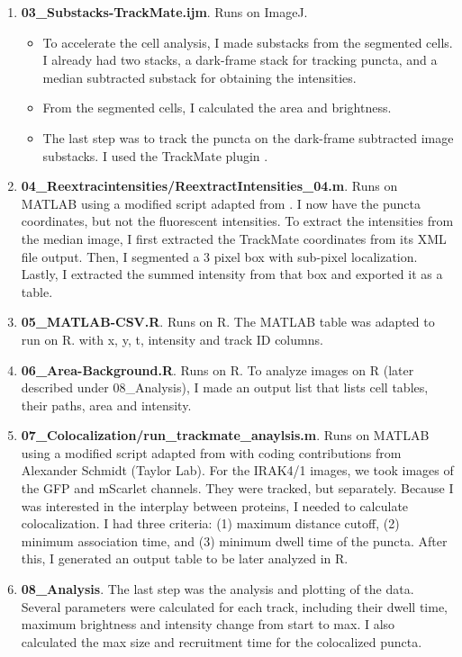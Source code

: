 \begin{enumerate}
\item \textbf{03\_Substacks-TrackMate.ijm}. Runs on ImageJ. 

\begin{itemize}

\item To accelerate the cell analysis, I made substacks from the segmented cells. I already had two stacks, a dark-frame stack for tracking puncta, and a median subtracted substack for obtaining the intensities.

\item From the segmented cells, I calculated the area and brightness.

\item The last step was to track the puncta on the dark-frame subtracted image substacks. I used the TrackMate plugin \autocite{Tinevez_2017}.

\end{itemize}

\item \textbf{04\_Reextracintensities/ReextractIntensities\_04.m}. Runs on MATLAB using a modified script adapted from \autocite{Taylor_2017}. I now have the puncta coordinates, but not the fluorescent intensities. To extract the intensities from the median image, I first extracted the TrackMate coordinates from its XML file output. Then, I segmented a 3 pixel box with sub-pixel localization. Lastly, I extracted the summed intensity from that box and exported it as a table.

\item \textbf{05\_MATLAB-CSV.R}. Runs on R. The MATLAB table was adapted to run on R. with x, y, t, intensity and track ID columns.

\item \textbf{06\_Area-Background.R}. Runs on R. To analyze images on R (later described under 08\_Analysis), I made an output list that lists cell tables, their paths, area and intensity.

\item \textbf{07\_Colocalization/run\_trackmate\_anaylsis.m}. Runs on MATLAB using a modified script adapted from \autocite{Taylor_2017} with coding contributions from Alexander Schmidt (Taylor Lab). For the IRAK4/1 images, we took images of the GFP and mScarlet channels. They were tracked, but separately. Because I was interested in the interplay between proteins, I needed to calculate colocalization. I had three criteria: (1) maximum distance cutoff, (2) minimum association time, and (3) minimum dwell time of the puncta. After this, I generated an output table to be later analyzed in R.

\item \textbf{08\_Analysis}. The last step was the analysis and plotting of the data. Several parameters were calculated for each track, including their dwell time, maximum brightness and intensity change from start to max. I also calculated the max size and recruitment time for the colocalized puncta.

\end{enumerate}

